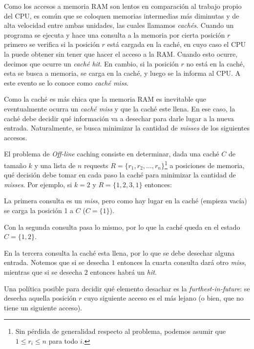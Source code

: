 
\item Como los accesos a memoria RAM son lentos en comparación al trabajo propio del CPU, es común que se coloquen memorias intermedias más diminutas y de alta velocidad entre ambas unidades, las cuales llamamos \textit{cachés}. Cuando un programa se ejecuta y hace una consulta a la memoria por cierta posición $r$ primero se verifica si la posición $r$ está cargada en la caché, en cuyo caso el CPU la puede obtener sin tener que hacer el acceso a la RAM. Cuando esto ocurre, decimos que ocurre un \textit{caché hit}. En cambio, si la posición $r$ no está en la caché, esta se busca a memoria, se carga en la caché, y luego se la informa al CPU. A este evento se lo conoce como \textit{caché miss}.

Como la caché es más chica que la memoria RAM es inevitable que eventualmente ocurra un \textit{caché miss} y que la caché este llena. En ese caso, la caché debe decidir qué información va a desechar para darle lugar a la nueva entrada. Naturalmente, se busca minimizar la cantidad de \textit{misses} de los siguientes accesos.

El problema de \textit{Off-line} caching consiste en determinar, dada una caché $C$ de tamaño $k$ y una lista de $n$ requests $R = \{r_1, r_2, \ldots, r_n\}$\footnote{Sin pérdida de generalidad respecto al problema, podemos asumir que $1 \leq r_i \leq n$ para todo $i$.} a posiciones de memoria, qué decisión debe tomar en cada paso la caché para minimizar la cantidad de \textit{misses}. Por ejemplo, si $k=2$ y $R=\{1,2,3,1\}$ entonces:

    \item La primera consulta es un \textit{miss}, pero como hay lugar en la caché (empieza vacía) se carga la posición 1 a $C$ ($C= \{1\}$).
    \item Con la segunda consulta pasa lo mismo, por lo que la caché queda en el estado $C= \{1, 2\}$.
    \item En la tercera consulta la caché esta llena, por lo que se debe desechar alguna entrada. Notemos que si se desecha $1$ entonces la cuarta consulta dará otro \textit{miss}, mientras que si se desecha $2$ entonces habrá un \textit{hit}.

Una política posible para decidir qué elemento desachar es la \textit{furthest-in-future}: se desecha aquella posición $r$ cuyo siguiente acceso es el más lejano (o bien, que no tiene un siguiente acceso). 

